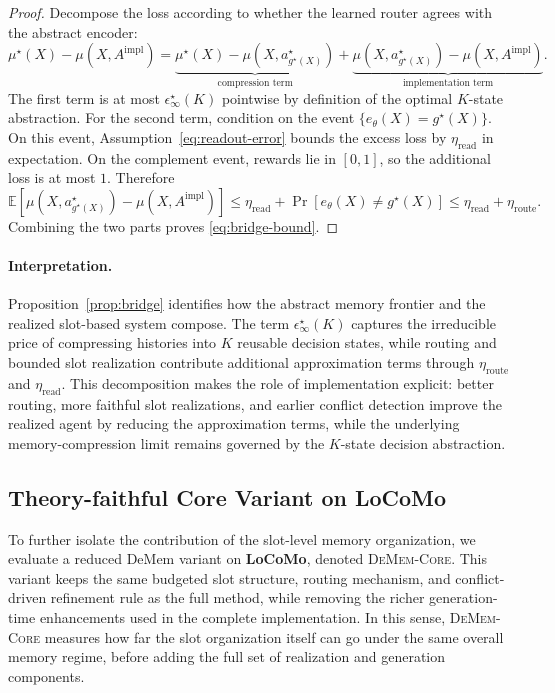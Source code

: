 \documentclass{article}
\theoremstyle{plain}
\theoremstyle{definition}
\theoremstyle{remark}
\newcommand{\eps}{\epsilon}
\newcommand{\EE}{\mathbb{E}}
\begin{document}
\begin{proof}
Decompose the loss according to whether the learned router agrees with the abstract encoder:
\[
\mu^\star(X)-\mu(X,A^{\mathrm{impl}})
=
\underbrace{\mu^\star(X)-\mu\!\left(X,a_{g^\star(X)}^\star\right)}_{\text{compression term}}
+
\underbrace{\mu\!\left(X,a_{g^\star(X)}^\star\right)-\mu(X,A^{\mathrm{impl}})}_{\text{implementation term}}.
\]
The first term is at most $\eps^\star_\infty(K)$ pointwise by definition of the optimal $K$-state abstraction.
For the second term, condition on the event $\{e_\theta(X)=g^\star(X)\}$.
On this event, Assumption~\eqref{eq:readout-error} bounds the excess loss by $\eta_{\mathrm{read}}$ in expectation.
On the complement event, rewards lie in $[0,1]$, so the additional loss is at most $1$.
Therefore
\[
\EE\!\left[\mu\!\left(X,a_{g^\star(X)}^\star\right)-\mu(X,A^{\mathrm{impl}})\right]
\le
\eta_{\mathrm{read}} + \Pr[e_\theta(X)\neq g^\star(X)]
\le
\eta_{\mathrm{read}}+\eta_{\mathrm{route}}.
\]
Combining the two parts proves \eqref{eq:bridge-bound}.
\end{proof}

\paragraph{Interpretation.}
Proposition~\ref{prop:bridge} identifies how the abstract memory frontier and the realized slot-based system compose.
The term $\eps^\star_\infty(K)$ captures the irreducible price of compressing histories into $K$ reusable decision states, while routing and bounded slot realization contribute additional approximation terms through $\eta_{\mathrm{route}}$ and $\eta_{\mathrm{read}}$.
This decomposition makes the role of implementation explicit:
better routing, more faithful slot realizations, and earlier conflict detection improve the realized agent by reducing the approximation terms, while the underlying memory-compression limit remains governed by the $K$-state decision abstraction.

\subsection{Theory-faithful Core Variant on LoCoMo}
\label{app:core-locomo}

To further isolate the contribution of the slot-level memory organization, we evaluate a reduced DeMem variant on \textbf{LoCoMo}, denoted \textsc{DeMem-Core}. This variant keeps the same budgeted slot structure, routing mechanism, and conflict-driven refinement rule as the full method, while removing the richer generation-time enhancements used in the complete implementation. In this sense, \textsc{DeMem-Core} measures how far the slot organization itself can go under the same overall memory regime, before adding the full set of realization and generation components.
\end{document}
